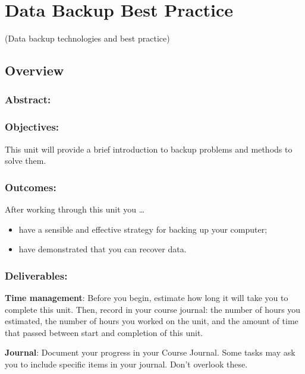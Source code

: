 \documentclass[]{book}
\providecommand{\tightlist}{%
  \setlength{\itemsep}{0pt}\setlength{\parskip}{0pt}}
\begin{document}
\chapter{Data Backup Best Practice}\label{backup}

(Data backup technologies and best practice)

\section{Overview}\label{overview-4}

\subsection{Abstract:}\label{abstract-4}

\subsection{Objectives:}\label{objectives-4}

This unit will provide a brief introduction to backup problems and
methods to solve them.

\subsection{Outcomes:}\label{outcomes-4}

After working through this unit you \ldots{}

\begin{itemize}
\tightlist
\item
  have a sensible and effective strategy for backing up your computer;
\item
  have demonstrated that you can recover data.
\end{itemize}

\subsection{Deliverables:}\label{deliverables-4}

\textbf{Time management}: Before you begin, estimate how long it will
take you to complete this unit. Then, record in your course journal: the
number of hours you estimated, the number of hours you worked on the
unit, and the amount of time that passed between start and completion of
this unit.

\textbf{Journal}: Document your progress in your Course Journal. Some
tasks may ask you to include specific items in your journal. Don't
overlook these.
\end{document}
